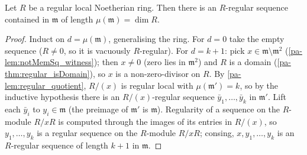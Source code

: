 \begin{theorem}
  \label{pa-thm:regular_system_isRegular}
  \leanok

  Let \(R\) be a regular local Noetherian ring. Then there is an \(R\)-regular sequence
  contained in \(\mathfrak m\) of length \(\mu(\mathfrak m) = \dim R\).
\end{theorem}
\begin{proof}
  \leanok
  Induct on \(d = \mu(\mathfrak m)\), generalising the ring. For \(d = 0\) take the
  empty sequence (\(R \neq 0\), so it is vacuously \(R\)-regular). For \(d = k + 1\):
  pick \(x \in \mathfrak m \setminus \mathfrak m^2\) (\ref{pa-lem:notMemSq_witness}); then
  \(x \neq 0\) (zero lies in \(\mathfrak m^2\)) and \(R\) is a domain
  (\ref{pa-thm:regular_isDomain}), so \(x\) is a non-zero-divisor on \(R\). By
  \ref{pa-lem:regular_quotient}, \(R/(x)\) is regular local with
  \(\mu(\mathfrak m') = k\), so by the inductive hypothesis there is an
  \(R/(x)\)-regular sequence \(\bar y_1, \dots, \bar y_k\) in \(\mathfrak m'\). Lift
  each \(\bar y_i\) to \(y_i \in \mathfrak m\) (the preimage of \(\mathfrak m'\) is
  \(\mathfrak m\)). Regularity of a sequence on the \(R\)-module \(R/xR\) is computed
  through the images of its entries in \(R/(x)\), so \(y_1, \dots, y_k\) is a regular
  sequence on the \(R\)-module \(R/xR\); consing, \(x, y_1, \dots, y_k\) is an
  \(R\)-regular sequence of length \(k + 1\) in \(\mathfrak m\).
\end{proof}

